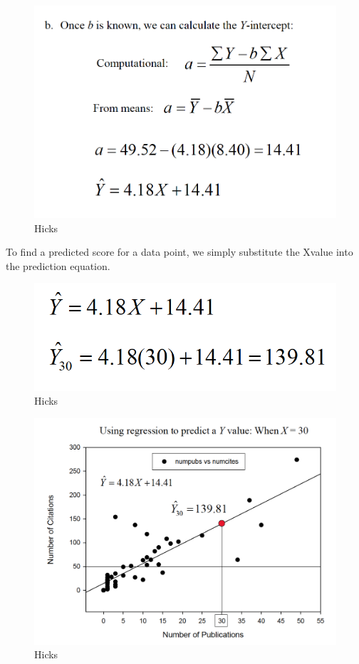 \documentclass[]{book}
\theoremstyle{definition}
\theoremstyle{definition}
\theoremstyle{definition}
\theoremstyle{remark}
\begin{document}
{\begin{figure}
\centering
\includegraphics{img/hicksreg5.png}
\caption{Hicks}
\end{figure}

To find a predicted score for a data point, we simply substitute the
Xvalue into the prediction equation.

\begin{figure}
\centering
\includegraphics{img/hicksreg6.png}
\caption{Hicks}
\end{figure}

\begin{figure}
\centering
\includegraphics{img/hicksreg7.png}
\caption{Hicks}
\end{figure}

}
\end{document}
